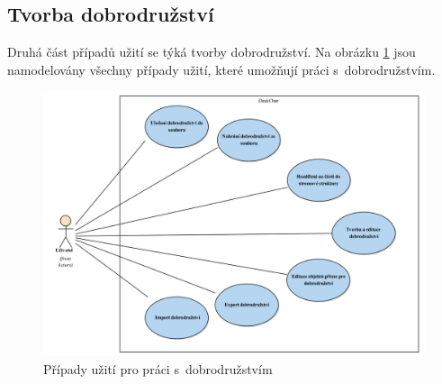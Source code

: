\documentclass[thesis=B,czech]{resources/FITthesis}[2012/06/26]
\begin{document}
\subsection{Tvorba dobrodružství}
Druhá část případů užití se týká tvorby dobrodružství. Na obrázku \ref{fig:uc_dobrodruzstvi} jsou namodelovány všechny případy užití, které umožňují práci s~dobrodružstvím.
	\begin{figure}\centering
		\includegraphics[width=1\textwidth]{images/usecase-dobrodruzstvi.pdf}
		\caption[Případy užití pro dobrodružství]{Případy užití pro práci s~dobrodružstvím}			\label{fig:uc_dobrodruzstvi}
	\end{figure}
	
\end{document}
